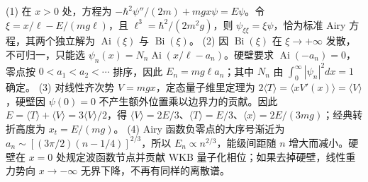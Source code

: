 (1) 在 \(x>0\) 处，方程为 \(-\hbar^2\psi''/(2m)+mgx\psi=E\psi\)。令 \(\xi=x/\ell-E/(mg\ell)\)，且 \(\ell^3=\hbar^2/(2m^2g)\)，则 \(\psi_{\xi\xi}=\xi\psi\)，恰为标准 Airy 方程，其两个独立解为 \(\operatorname{Ai}(\xi)\) 与 \(\operatorname{Bi}(\xi)\)。
(2) 因 \(\operatorname{Bi}(\xi)\) 在 \(\xi\to+\infty\) 发散，不可归一，只能选 \(\psi_n(x)=N_n\operatorname{Ai}(x/\ell-a_n)\)。硬壁要求 \(\operatorname{Ai}(-a_n)=0\)，零点按 \(0<a_1<a_2<\cdots\) 排序，因此 \(E_n=mg\ell a_n\)；其中 \(N_n\) 由 \(\int_0^\infty|\psi_n|^2dx=1\) 确定。
(3) 对线性齐次势 \(V=mgx\)，定态量子维里定理为 \(2\langle T\rangle=\langle xV'(x)\rangle=\langle V\rangle\)，硬壁因 \(\psi(0)=0\) 不产生额外位置乘以边界力的贡献。因此 \(E=\langle T\rangle+\langle V\rangle=3\langle V\rangle/2\)，得 \(\langle V\rangle=2E/3\)、\(\langle T\rangle=E/3\)、\(\langle x\rangle=2E/(3mg)\)；经典转折高度为 \(x_t=E/(mg)\)。
(4) Airy 函数负零点的大序号渐近为 \(a_n\sim[(3\pi/2)(n-1/4)]^{2/3}\)，所以 \(E_n\propto n^{2/3}\)，能级间距随 \(n\) 增大而减小。硬壁在 \(x=0\) 处规定波函数节点并贡献 WKB 量子化相位；如果去掉硬壁，线性重力势向 \(x\to-\infty\) 无界下降，不再有同样的离散谱。
